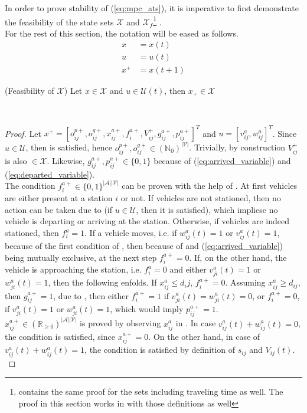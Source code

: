 In order to prove stability of (\ref{eq:mpc_ats}), it is imperative to first demonstrate the feasibility of the state sets $\mathcal{X}$ and $\mathcal{X}_f$\footnote{ contains the same proof for the sets including traveling time as well. The proof in this section works in with those definitions as well} .\\
For the rest of this section, the notation will be eased as follows. 
\begin{align*}
	x &= x(t)\\
	u &= u(t)\\
	x^+ &= x(t+1)
\end{align*} 

\begin{proposition}{(Feasibility of $\mathcal{X}$)}\label{pro:feas_x}
	Let $x \in \mathcal{X}$ and $u \in \mathcal{U}(t)$, then $x_+ \in \mathcal{X}$
\end{proposition}\\
\begin{proof}
 Let $x^+ = [o_{ij}^{p+}, o_{ij}^{g+}, x_{ij}^{a+}, f^{a+}_{i}, V_{ij}^{+}, g^{a+}_{ij}, p^{a+}_{ij}]^T$ and $u = [v^{a}_{ij}, w^{a}_{ij}]^T$. Since $u \in \mathcal{U}$, then  is satisfied, hence $o_{ij}^{p+}, o_{ij}^{g+} \in (\mathbb{N}_0)^{|\mathcal{V}|}$. Trivially, by construction $V_{ij}^{+}$ is also $\in \mathcal{X}$. Likewise, $g^{a+}_{ij}, p^{a+}_{ij} \in \{0,1\}$ because of (\ref{eq:arrived_variable}) and (\ref{eq:departed_variable}). \\
The condition $f^{a+}_{i} \in \{0,1\}^{|\mathcal{A}||\mathcal{V}|}$ can be proven with the help of . At first vehicles are either present at a station $i$ or not. If vehicles are not stationed, then no action can be taken due to  (if $u \in \mathcal{U}$, then it is satisfied), which impliese no vehicle is departing or arriving at the station. Otherwise, if vehicles are indeed stationed, then $f^{a}_{i} = 1$. If a vehicle moves, i.e. if $w^a_{ij}(t) = 1$ or $v^a_{ij}(t) = 1$, because of the first condition of , then because of  and (\ref{eq:arrived_variable}) being mutually exclusive, at the next step $f^{a+}_{i} =0$. If, on the other hand, the vehicle is approaching the station, i.e. $f^{a}_{i} =0$ and 
either $v^a_{ji}(t) = 1$ or $w^a_{ji}(t) = 1$, then the following enfolds. If $x_{ij}^{a} \leq d_ij$, $f^{a+}_{i} =0$. Assuming $x_{ij}^{a} \ge d_{ij}$, then $g^{a+}_{ij} = 1$, due to , then either $f^{a+}_{i} =1$ if  $v^a_{ji}(t) = w^a_{ji}(t) = 0$, or $f^{a+}_{i} =0$, if $v^a_{ji}(t) = 1$ or $w^a_{ji}(t) = 1$, which would imply $p^{a+}_{ij}=1$. \\
 $x_{ij}^{a+}\in (\mathbb{R}_{\ge 0})^{|\mathcal{A}||\mathcal{V}|}$ is proved by observing $x_{ij}^a$ in  . In case $v^a_{ij}(t) + w^a_{ij}(t)= 0$, the condition is satisfied, since  $x_{ij}^{a+} = 0$.  On the other hand, in case of $v^a_{ij}(t) + w^a_{ij}(t)= 1$, the condition is satisfied by definition of $s_{ij}$ and $V_{ij}(t)$.\\
 \end{proof}


